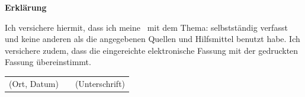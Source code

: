 \clearpage

\thispagestyle{empty}

{\LARGE\textsf{\textbf{Erklärung}}\bigskip}

Ich versichere hiermit, dass ich meine \bootstrapPaperType\ mit dem Thema: \emph{\bootstrapPaperTitle} selbstständig verfasst und keine anderen als die angegebenen Quellen und Hilfsmittel benutzt habe.
Ich versichere zudem, dass die eingereichte elektronische Fassung mit der gedruckten Fassung übereinstimmt.

\vspace{3cm}

\begin{center}
    \begin{tabular}{ccc}
        (Ort, Datum) & \hspace{0.3\linewidth} & (Unterschrift)
    \end{tabular}
\end{center}
